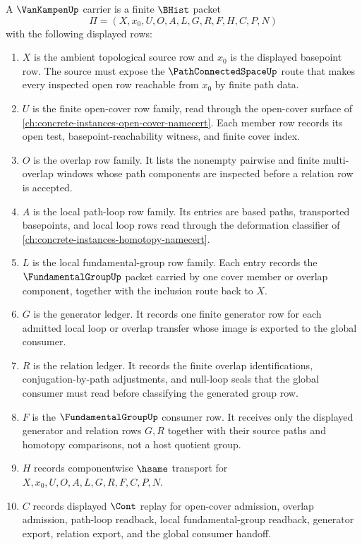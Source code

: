 \begin{definition}
\label{def:van-kampen-carrier}
A $\VanKampenUp$ carrier is a finite $\BHist$ packet
$$
\Pi=(X,x_0,U,O,A,L,G,R,F,H,C,P,N)
$$
with the following displayed rows:
\begin{enumerate}
\item $X$ is the ambient topological source row and $x_0$ is the displayed basepoint row. The source must expose the $\PathConnectedSpaceUp$ route that makes every inspected open row reachable from $x_0$ by finite path data.
\item $U$ is the finite open-cover row family, read through the open-cover surface of \autoref{ch:concrete-instances-open-cover-namecert}. Each member row records its open test, basepoint-reachability witness, and finite cover index.
\item $O$ is the overlap row family. It lists the nonempty pairwise and finite multi-overlap windows whose path components are inspected before a relation row is accepted.
\item $A$ is the local path-loop row family. Its entries are based paths, transported basepoints, and local loop rows read through the deformation classifier of \autoref{ch:concrete-instances-homotopy-namecert}.
\item $L$ is the local fundamental-group row family. Each entry records the $\FundamentalGroupUp$ packet carried by one cover member or overlap component, together with the inclusion route back to $X$.
\item $G$ is the generator ledger. It records one finite generator row for each admitted local loop or overlap transfer whose image is exported to the global consumer.
\item $R$ is the relation ledger. It records the finite overlap identifications, conjugation-by-path adjustments, and null-loop seals that the global consumer must read before classifying the generated group row.
\item $F$ is the $\FundamentalGroupUp$ consumer row. It receives only the displayed generator and relation rows $G,R$ together with their source paths and homotopy comparisons, not a host quotient group.
\item $H$ records componentwise $\hsame$ transport for $X,x_0,U,O,A,L,G,R,F,C,P,N$.
\item $C$ records displayed $\Cont$ replay for open-cover admission, overlap admission, path-loop readback, local fundamental-group readback, generator export, relation export, and the global consumer handoff.

\end{enumerate}
\end{definition}
